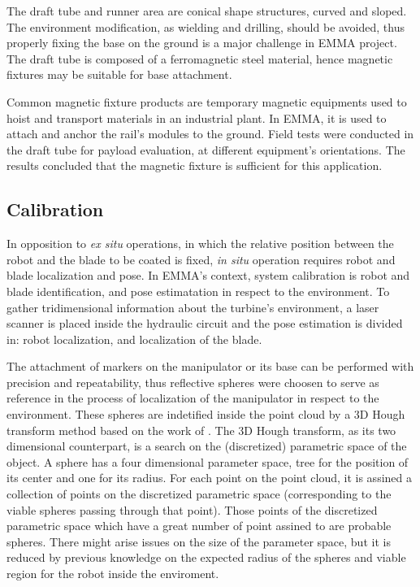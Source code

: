 The draft tube and runner area are conical shape structures, curved and
sloped. The environment modification, as wielding and drilling, should be
avoided, thus properly fixing the base on the ground is a major challenge in
EMMA project. The draft tube is composed of a ferromagnetic steel material,
hence magnetic fixtures may be suitable for base attachment. 

Common magnetic fixture products are temporary magnetic equipments used to hoist
and transport materials in an industrial plant. In EMMA, it is used to attach
and anchor the rail's modules to the ground. Field tests were conducted in the
draft tube for payload evaluation, at different equipment's orientations. The
results concluded that the magnetic fixture is sufficient for this application.

\subsection{Calibration}

In opposition to \textit{ex situ} operations, in which the relative position
between the robot and the blade to be coated is fixed, \textit{in situ}
operation requires robot and blade localization and pose. In EMMA's context,
system calibration is robot and blade identification, and pose estimatation in
respect to the environment. To gather tridimensional information about the
turbine's environment, a laser scanner is placed inside the hydraulic circuit
and the pose estimation is divided in: robot localization, and
localization of the blade.
 
The attachment of markers on the manipulator or its base can be performed with
precision and repeatability, thus reflective spheres were choosen to serve
as reference in the process of localization of the manipulator in respect to the
environment. These spheres are indetified inside the point cloud by a 3D Hough
transform method based on the work of \cite{camurri20143d}. The 3D Hough
transform, as its two dimensional counterpart, is a search on the (discretized)
parametric space of the object. A sphere has a four dimensional parameter space, tree for
the position of its center and one for its radius. For each point on the point
cloud, it is assined a collection of points on the discretized parametric space
(corresponding to the viable spheres passing through that point). Those points
of the discretized parametric space which have a great number of point assined
to are probable spheres. There might arise issues on the size of the parameter
space, but it is reduced by previous knowledge on the expected radius of the
spheres and viable region for the robot inside the enviroment.

